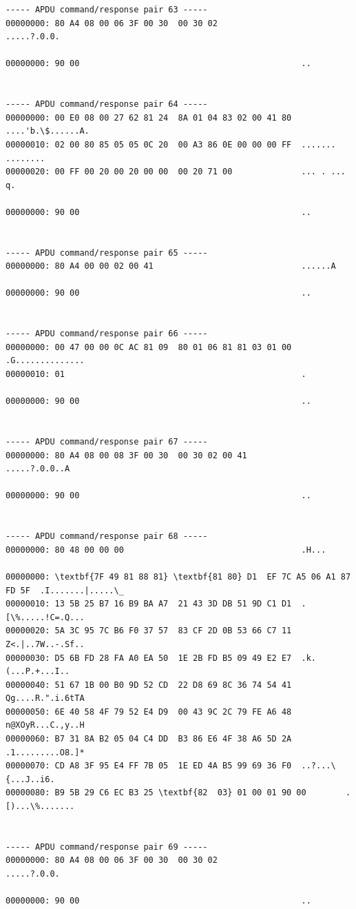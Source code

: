 \documentclass[bsc,frontabs,twoside,singlespacing,parskip,deptreport]{infthesis}     %
\begin{document}
\begin{appendices}
\begin{Verbatim}[commandchars=\\\{\}, fontsize=\small]
----- APDU command/response pair 63 -----
00000000: 80 A4 08 00 06 3F 00 30  00 30 02                 .....?.0.0.

00000000: 90 00                                             ..


----- APDU command/response pair 64 -----
00000000: 00 E0 08 00 27 62 81 24  8A 01 04 83 02 00 41 80  ....'b.\$......A.
00000010: 02 00 80 85 05 05 0C 20  00 A3 86 0E 00 00 00 FF  ....... ........
00000020: 00 FF 00 20 00 20 00 00  00 20 71 00              ... . ... q.

00000000: 90 00                                             ..


----- APDU command/response pair 65 -----
00000000: 80 A4 00 00 02 00 41                              ......A

00000000: 90 00                                             ..


----- APDU command/response pair 66 -----
00000000: 00 47 00 00 0C AC 81 09  80 01 06 81 81 03 01 00  .G..............
00000010: 01                                                .

00000000: 90 00                                             ..


----- APDU command/response pair 67 -----
00000000: 80 A4 08 00 08 3F 00 30  00 30 02 00 41           .....?.0.0..A

00000000: 90 00                                             ..


----- APDU command/response pair 68 -----
00000000: 80 48 00 00 00                                    .H...

00000000: \textbf{7F 49 81 88 81} \textbf{81 80} D1  EF 7C A5 06 A1 87 FD 5F  .I.......|.....\_
00000010: 13 5B 25 B7 16 B9 BA A7  21 43 3D DB 51 9D C1 D1  .[\%.....!C=.Q...
00000020: 5A 3C 95 7C B6 F0 37 57  83 CF 2D 0B 53 66 C7 11  Z<.|..7W..-.Sf..
00000030: D5 6B FD 28 FA A0 EA 50  1E 2B FD B5 09 49 E2 E7  .k.(...P.+...I..
00000040: 51 67 1B 00 B0 9D 52 CD  22 D8 69 8C 36 74 54 41  Qg....R.".i.6tTA
00000050: 6E 40 58 4F 79 52 E4 D9  00 43 9C 2C 79 FE A6 48  n@XOyR...C.,y..H
00000060: B7 31 8A B2 05 04 C4 DD  B3 86 E6 4F 38 A6 5D 2A  .1.........O8.]*
00000070: CD A8 3F 95 E4 FF 7B 05  1E ED 4A B5 99 69 36 F0  ..?...\{...J..i6.
00000080: B9 5B 29 C6 EC B3 25 \textbf{82  03} 01 00 01 90 00        .[)...\%.......


----- APDU command/response pair 69 -----
00000000: 80 A4 08 00 06 3F 00 30  00 30 02                 .....?.0.0.

00000000: 90 00                                             ..



\end{Verbatim}
\end{appendices}
\end{document}
